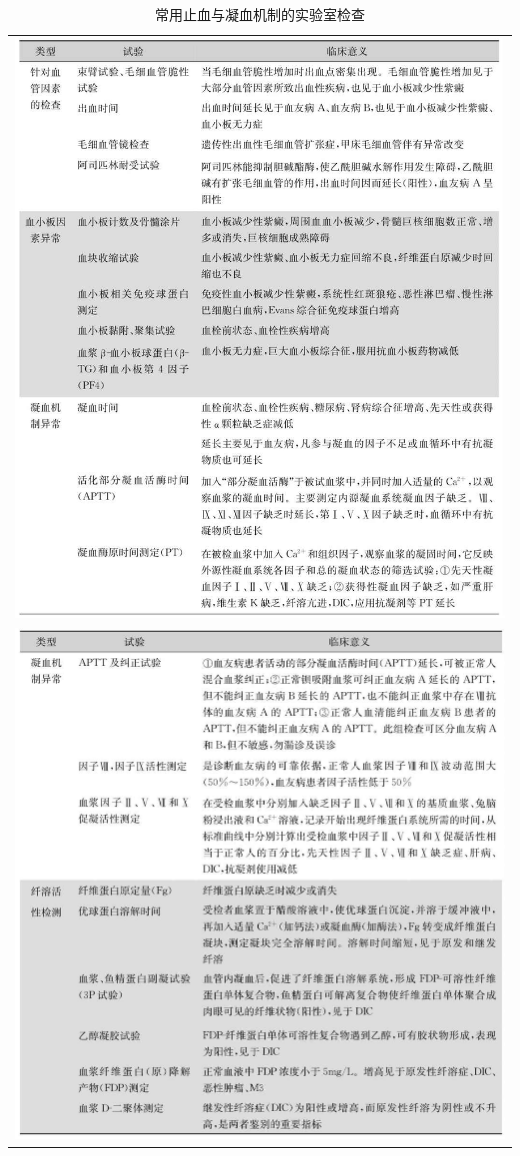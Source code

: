 \begin{longtable}{c}
 \caption{常用止血与凝血机制的实验室检查}
 \label{tab34-2}
 \endfirsthead
 \caption[]{常用止血与凝血机制的实验室检查}
 \endhead
 \includegraphics[width=\textwidth,height=\textheight,keepaspectratio]{./images/Image00195.jpg}\\
 \includegraphics[width=\textwidth,height=\textheight,keepaspectratio]{./images/Image00196.jpg}
 \end{longtable}

